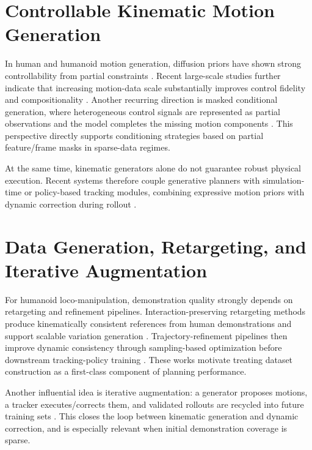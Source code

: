 \section{Controllable Kinematic Motion Generation}

In human and humanoid motion generation, diffusion priors have shown strong controllability from partial constraints \cite{tevet2023human,serifi2024robot,xie2024omnicontrol}. Recent large-scale studies further indicate that increasing motion-data scale substantially improves control fidelity and compositionality \cite{rempe2026kimodo}. Another recurring direction is masked conditional generation, where heterogeneous control signals are represented as partial observations and the model completes the missing motion components \cite{tessler2024maskedmimic}. This perspective directly supports conditioning strategies based on partial feature/frame masks in sparse-data regimes.

At the same time, kinematic generators alone do not guarantee robust physical execution. Recent systems therefore couple generative planners with simulation-time or policy-based tracking modules, combining expressive motion priors with dynamic correction during rollout \cite{kalaria2025dreamcontrol,liao2025beyondmimic,tevet2024closdclosingloopsimulation,wu2025uniphys}.

\section{Data Generation, Retargeting, and Iterative Augmentation}

For humanoid loco-manipulation, demonstration quality strongly depends on retargeting and refinement pipelines. Interaction-preserving retargeting methods produce kinematically consistent references from human demonstrations and support scalable variation generation \cite{omniretarget}. Trajectory-refinement pipelines then improve dynamic consistency through sampling-based optimization before downstream tracking-policy training \cite{dynaretarget}. These works motivate treating dataset construction as a first-class component of planning performance.

Another influential idea is iterative augmentation: a generator proposes motions, a tracker executes/corrects them, and validated rollouts are recycled into future training sets \cite{xu2025parc}. This closes the loop between kinematic generation and dynamic correction, and is especially relevant when initial demonstration coverage is sparse.

